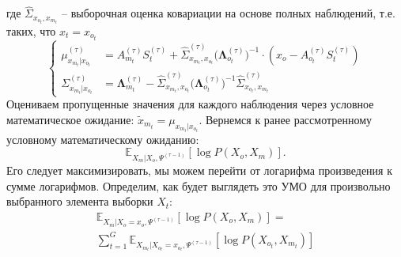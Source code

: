 \documentclass[11pt]{article}
\newcommand{\Expect}{\mathbb{E}}
\begin{document}
где $\hat{\Sigma}_{x_{o_t},x_{m_t}}$ -- выборочная оценка ковариации на основе полных наблюдений, т.е. таких, что $x_t = x_{o_t}$
\begin{equation}
\left\{ \begin{aligned} 
\mu_{x_{m_t}|x_{o_t}}^{(\tau)} &= A_{m_t}^{(\tau)}S_t^{(\tau)} + \hat{\Sigma}_{x_{m_t},x_{o_t}}^{(\tau)}\Big(\mathbf{\Lambda}_{o_t}^{(\tau)}\Big)^{-1}\cdot(x_o-A_{o_t}^{(\tau)}S_t^{(\tau)}) \\
\Sigma_{x_{m_t}|x_{o_t}}^{(\tau)} &= \mathbf{\Lambda}_{m_t}^{(\tau)}-\hat{\Sigma}_{x_{m_t},x_{o_t}}^{(\tau)}\Big(\mathbf{\Lambda}_{o_t}^{(\tau)}\Big)^{-1}\hat{\Sigma}_{x_{o_t},x_{m_t}}^{(\tau)}
\end{aligned} \right.
\end{equation}
Оцениваем пропущенные значения для каждого наблюдения через условное математическое ожидание:
$\widetilde{x}_{m_t} = \mu_{x_{m_t}|x_{o_t}}$.
Вернемся к ранее рассмотренному условному математическому ожиданию:
\begin{equation*}
 \Expect_{X_m|X_o, \Psi^{(\tau-1)}}[\log P(X_o, X_m)].
\end{equation*}
Его следует максимизировать, мы можем перейти от логарифма произведения к сумме логарифмов. Определим, как будет выглядеть это УМО для произвольно выбранного элемента выборки $X_t$:
\begin{equation*}
\begin{gathered}
 \Expect_{X_m|X_o=x_o, \Psi^{(\tau-1)}}[\log P(X_o, X_m)] = \\
 \sum_{t=1}^G\Expect_{X_{m_t}|X_{o_t}=x_{o_t}, \Psi^{(\tau-1)}}[\log P(X_{o_t}, X_{m_t})]
\end{gathered}
\end{equation*}
\\
\\
\end{document}

